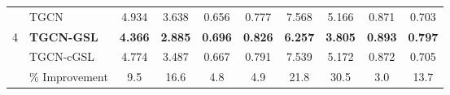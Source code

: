 \documentclass[pdflatex,sn-mathphys-num]{sn-jnl}%
\theoremstyle{thmstyleone}%
\theoremstyle{thmstyletwo}%
\theoremstyle{thmstylethree}%
\begin{document}
\begin{table}[t]
\begin{tabular}{cl|cccc|cccc}
 \hdashline
  &             TGCN &          4.934 &          3.638 &          0.656 &          0.777 &          7.568 &          5.166 &          0.871 &          0.703 \\
 4 &  \textbf{TGCN-GSL} & \textbf{4.366} & \textbf{2.885} & \textbf{0.696} & \textbf{0.826} & \textbf{6.257} & \textbf{3.805} & \textbf{0.893} & \textbf{0.797} \\
  & TGCN-cGSL &          4.774 &          3.487 &          0.667 &          0.791 &          7.539 &          5.172 &          0.872 &          0.705 \\
  \hdashline
  & \% Improvement &           9.5 &           16.6 &            4.8 &            4.9 &           21.8 &           30.5 &            3.0 &           13.7 \\
\bottomrule
\end{tabular}
\end{table}
\end{document}
